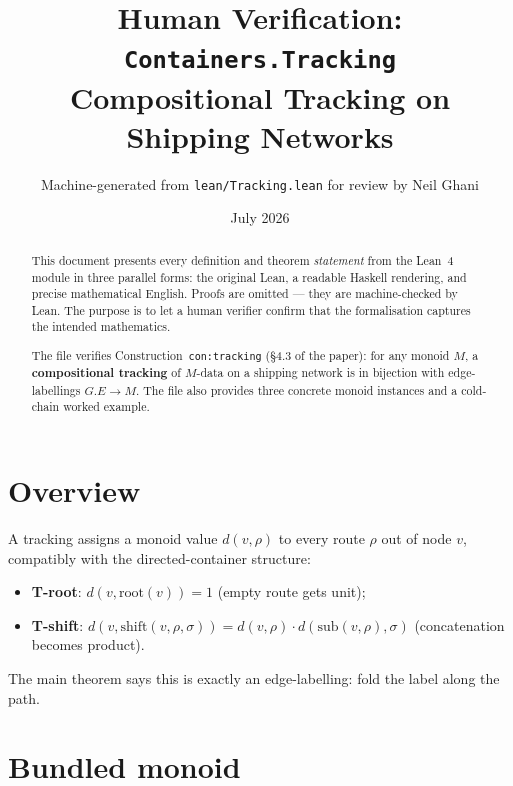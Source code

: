 \documentclass[11pt,a4paper]{article}
\title{Human Verification: \texttt{Containers.Tracking}\\[4pt]
  \large Compositional Tracking on Shipping Networks}
\author{Machine-generated from \texttt{lean/Tracking.lean} for review by Neil Ghani}
\date{July 2026}
\begin{document}
\maketitle

\begin{abstract}
This document presents every definition and theorem \emph{statement} from the
Lean~4 module  in three parallel forms: the original
Lean, a readable Haskell rendering, and precise mathematical English.  Proofs
are omitted --- they are machine-checked by Lean.  The purpose is to let a
human verifier confirm that the formalisation captures the intended
mathematics.

The file verifies Construction~\texttt{con:tracking} (\S4.3 of the paper): for
any monoid $M$, a \textbf{compositional tracking} of $M$-data on a shipping
network is in bijection with edge-labellings $G.E \to M$.  The file also
provides three concrete monoid instances and a cold-chain worked example.
\end{abstract}

\tableofcontents
\bigskip

\section{Overview}

A tracking assigns a monoid value $d(v, \rho)$ to every route $\rho$ out of
node $v$, compatibly with the directed-container structure:
\begin{itemize}
  \item \textbf{T-root}: $d(v, \mathrm{root}(v)) = 1$ (empty route gets unit);
  \item \textbf{T-shift}: $d(v, \mathrm{shift}(v, \rho, \sigma)) = d(v, \rho)
    \cdot d(\mathrm{sub}(v, \rho), \sigma)$ (concatenation becomes product).
\end{itemize}
The main theorem says this is exactly an edge-labelling: fold the label along the
path.


\section{Bundled monoid}

\end{document}
